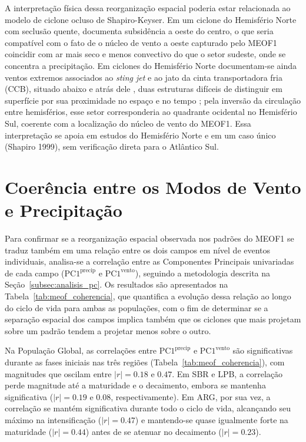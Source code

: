 A interpretação física dessa reorganização espacial poderia estar relacionada ao modelo de ciclone ocluso de Shapiro-Keyser. Em um ciclone do Hemisfério Norte com seclusão quente, \citet{shapiro1999bridge} documenta subsidência a oeste do centro, o que seria compatível com o fato de o núcleo de vento a oeste capturado pelo MEOF1 coincidir com ar mais seco e menos convectivo do que o setor sudeste, onde se concentra a precipitação. Em ciclones do Hemisfério Norte documentam-se ainda ventos extremos associados ao \textit{sting jet} e ao jato da cinta transportadora fria (CCB), situado abaixo e atrás dele \citep{clark2005sting, clark2018sting}, duas estruturas difíceis de distinguir em superfície por sua proximidade no espaço e no tempo \citep{eisenstein2023identification}; pela inversão da circulação entre hemisférios, esse setor corresponderia ao quadrante ocidental no Hemisfério Sul, coerente com a localização do núcleo de vento do MEOF1. Essa interpretação se apoia em estudos do Hemisfério Norte e em um caso único (Shapiro 1999), sem verificação direta para o Atlântico Sul.

\section{Coerência entre os Modos de Vento e Precipitação}
\label{sec:meof_coherencia}

Para confirmar se a reorganização espacial observada nos padrões do MEOF1 se traduz também em uma relação entre os dois campos em nível de eventos individuais, analisa-se a correlação entre as Componentes Principais univariadas de cada campo ($\text{PC1}^{\text{precip}}$ e $\text{PC1}^{\text{vento}}$), seguindo a metodologia descrita na Seção~\ref{subsec:analisis_pc}. Os resultados são apresentados na Tabela~\ref{tab:meof_coherencia}, que quantifica a evolução dessa relação ao longo do ciclo de vida para ambas as populações, com o fim de determinar se a separação espacial dos campos implica também que os ciclones que mais projetam sobre um padrão tendem a projetar menos sobre o outro.



Na População Global, as correlações entre $\text{PC1}^{\text{precip}}$ e $\text{PC1}^{\text{vento}}$ são significativas durante as fases iniciais nas três regiões (Tabela~\ref{tab:meof_coherencia}), com magnitudes que oscilam entre $|r|=0.18$ e $0.47$. Em SBR e LPB, a correlação perde magnitude até a maturidade e o decaimento, embora se mantenha significativa ($|r|=0.19$ e $0.08$, respectivamente). Em ARG, por sua vez, a correlação se mantém significativa durante todo o ciclo de vida, alcançando seu máximo na intensificação ($|r|=0.47$) e mantendo-se quase igualmente forte na maturidade ($|r|=0.44$) antes de se atenuar no decaimento ($|r|=0.23$).

